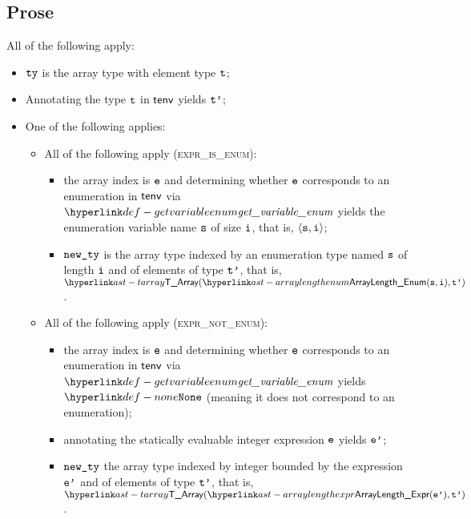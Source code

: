 \subsection{Prose}
All of the following apply:
\begin{itemize}
  \item $\texttt{ty}$ is the array type with element type $\texttt{t}$;
  \item Annotating the type $\texttt{t}$ in $\textsf{tenv}$ yields $\texttt{t'}$\ProseOrTypeError;
  \item One of the following applies:
  \begin{itemize}
    \item All of the following apply (\textsc{expr\_is\_enum}):
    \begin{itemize}
      \item the array index is $\texttt{e}$ and determining whether $\texttt{e}$ corresponds to an enumeration in $\textsf{tenv}$
      via $\getvariableenum$ yields the enumeration variable
      name $\texttt{s}$ of size $\texttt{i}$, that is, $\langle \texttt{s}, \texttt{i} \rangle$\ProseOrTypeError;
      \item $\texttt{new\_ty}$ is the array type indexed by an enumeration type
      named $\texttt{s}$ of length $\texttt{i}$ and of elements of type $\texttt{t'}$, that is, $\TArray(\ArrayLengthEnum(\vs, \vi), \vtp)$.
    \end{itemize}

    \item All of the following apply (\textsc{expr\_not\_enum}):
    \begin{itemize}
      \item the array index is $\texttt{e}$ and determining whether $\texttt{e}$ corresponds to an enumeration in $\textsf{tenv}$
      via $\getvariableenum$ yields $\None$ (meaning it does not
      correspond to an enumeration)\ProseOrTypeError;
      \item annotating the statically evaluable integer expression $\texttt{e}$ yields
      $\texttt{e'}$\ProseOrTypeError;
      \item $\texttt{new\_ty}$ the array type indexed by integer bounded by
      the expression $\texttt{e'}$ and of elements of type $\texttt{t'}$, that is,
      $\TArray(\ArrayLengthExpr(\vep), \vtp)$.
    \end{itemize}


\end{itemize}
\end{itemize}
